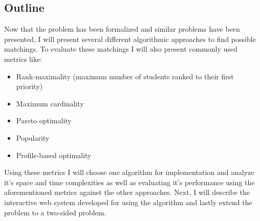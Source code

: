 \subsection{Outline}
Now that the problem has been formalized and similar problems have been presented, I will present several different algorithmic approaches to find possible matchings. To evaluate these matchings I will also present commonly used metrics like:
\begin{itemize}[itemsep=0pt]
    \item Rank-maximality (maximum number of students ranked to their first priority)
    \item Maximum cardinality
    \item Pareto optimality
    \item Popularity 
    \item Profile-based optimality
\end{itemize}
Using these metrics I will choose one algorithm for implementation and analyze it's space and time complexities as well as evaluating it's performance using the aforementioned metrics against the other approaches. Next, I will describe the interactive web system developed for using the algorithm and lastly extend the problem to a two-sided problem. 